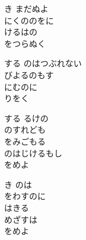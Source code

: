 \documentclass[10pt,b5j]{tarticle} %
\begin{document}
\vspace{1.5em} %
\newcommand{\linespace}{0.5em} %
\newcommand{\blocksize}{0.5\hsize} %
\begin{enumerate} %
    \begin{minipage}[c]{\blocksize}
    
        \vspace{\linespace}
        \item
        き まだぬよ\\
        にくののをに\\
        けるはの\\
        をつらぬく
        
        \vspace{\linespace}
        \item
        する のはつぶれない\\
        びよるのもす\\
        にむのに\\
        りをく
        
        \vspace{\linespace}
        \item
        する るけの\\
        のすれども\\
        をみごもる\\
        のはじけるもし\\
        をめよ
        
        \vspace{\linespace}
        \item
        き のは\\
        をわすのに\\
        はきる\\
        めざすは\\
        をめよ
    
    \end{minipage}
\end{enumerate} %
\end{document}
